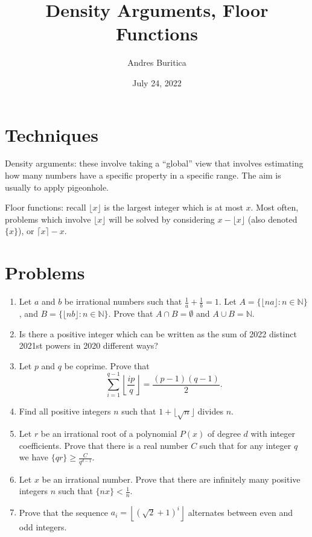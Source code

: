 \documentclass{article}
\title{Density Arguments, Floor Functions}
\author{Andres Buritica}
\date{July 24, 2022}
\begin{document}
\maketitle
\section{Techniques}
  Density arguments: these involve taking a ``global'' view that involves
  estimating how many numbers have a specific property in a specific range.
  The aim is usually to apply pigeonhole.

  Floor functions: recall $\lfloor x\rfloor$ is the largest integer which is at
  most $x$. Most often, problems which involve $\lfloor x\rfloor$ will be
  solved by considering $x-\lfloor x\rfloor$ (also denoted $\{x\}$), or $\lceil
  x\rceil-x$.
\section{Problems}
\begin{enumerate}
  \item Let $a$ and $b$ be irrational numbers such that $\frac 1a+\frac 1b=1$.
    Let $A=\{\lfloor na\rfloor: n\in\mathbb N\}$, and $B=\{\lfloor nb\rfloor:
    n\in\mathbb N\}$. Prove that $A\cap B=\emptyset$ and $A\cup B=\mathbb N$.
  \item Is there a positive integer which can be written as the sum of 2022
    distinct 2021st powers in 2020 different ways?
  \item Let $p$ and $q$ be coprime. Prove that
    \[\sum_{i=1}^{q-1}\left\lfloor\frac{ip}{q}\right\rfloor=\frac{(p-1)(q-1)}2.\]
  \item Find all positive integers $n$ such that $1+\lfloor\sqrt n\rfloor$
    divides $n$.
  \item Let $r$ be an irrational root of a polynomial $P(x)$ of degree $d$ with
    integer coefficients. Prove that there is a real number $C$ such that for
    any integer $q$ we have $\{qr\}\ge \frac C{q^{d-1}}$.
  \item Let $x$ be an irrational number. Prove that there are infinitely many
    positive integers $n$ such that $\{nx\}<\frac 1n$.
  \item Prove that the sequence $a_i=\left\lfloor(\sqrt 2+1)^i\right\rfloor$
    alternates between even and odd integers.
\end{enumerate}
\newpage
\end{document}
